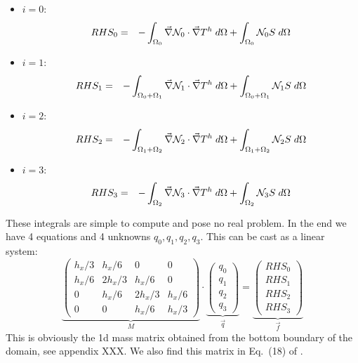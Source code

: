 \begin{itemize}
\item $i=0$:
\begin{eqnarray}
RHS_0 
&=& -\int_{\Omega_0} \vec\nabla {\mathcal{N}}_0 \cdot \vec\nabla T^h \; d\Omega + \int_{\Omega_0} {\mathcal{N}}_0 S \; d\Omega
\end{eqnarray}

\item $i=1$:
\begin{eqnarray}
RHS_1
&=& -\int_{\Omega_0+\Omega_1} \vec\nabla {\mathcal{N}}_1 \cdot \vec\nabla T^h \; d\Omega + \int_{\Omega_0+\Omega_1} {\mathcal{N}}_1 S \; d\Omega
\end{eqnarray}

\item $i=2$:
\begin{eqnarray}
RHS_2
&=& -\int_{\Omega_1+\Omega_2} \vec\nabla {\mathcal{N}}_2 \cdot \vec\nabla T^h \; d\Omega + \int_{\Omega_1+\Omega_2} {\mathcal{N}}_2 S \; d\Omega
\end{eqnarray}

\item $i=3$:
\begin{eqnarray}
RHS_3
&=& -\int_{\Omega_2} \vec\nabla {\mathcal{N}}_3 \cdot \vec\nabla T^h \; d\Omega + \int_{\Omega_2} {\mathcal{N}}_3 S \; d\Omega
\end{eqnarray}

\end{itemize}




These integrals are simple to compute and pose no real problem. 
In the end we have 4 equations and 4 unknowns $q_0,q_1,q_2,q_3$.
This can be cast as a linear system:
\begin{equation}
\underbrace{
\left(
\begin{array}{cccc}
h_x/3 & h_x/6  &  0 & 0\\
h_x/6 & 2h_x/3  & h_x/6  & 0\\
0 & h_x/6  & 2h_x/3  & h_x/6 \\ 
0 & 0  &  h_x/6 & h_x/3
\end{array}
\right)
}_{M}
\cdot
\underbrace{
\left(
\begin{array}{c}
q_0 \\ q_1 \\ q_2 \\ q_3
\end{array}
\right)
}_{\vec{q}}
=
\underbrace{
\left(
\begin{array}{c}
RHS_0 \\ RHS_1 \\ RHS_2 \\ RHS_3
\end{array}
\right)
}_{\vec{f}}
\label{eq:mizu2}
\end{equation}
This is obviously the 1d mass matrix obtained from the bottom boundary of the domain,
see appendix XXX.
We also find this matrix in Eq.~(18) of \textcite{cacs85}.


